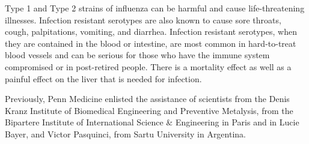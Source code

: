 \documentclass{article}
\begin{document}
Type 1 and Type 2 strains of influenza can be harmful and cause life-threatening illnesses. Infection resistant serotypes are also known to cause sore throats, cough, palpitations, vomiting, and diarrhea. Infection resistant serotypes, when they are contained in the blood or intestine, are most common in hard-to-treat blood vessels and can be serious for those who have the immune system compromised or in post-retired people. There is a mortality effect as well as a painful effect on the liver that is needed for infection.

Previously, Penn Medicine enlisted the assistance of scientists from the Denis Kranz Institute of Biomedical Engineering and Preventive Metalysis, from the Bipartere Institute of International Science \& Engineering in Paris and in Lucie Bayer, and Victor Pasquinci, from Sartu University in Argentina.
\end{document}
